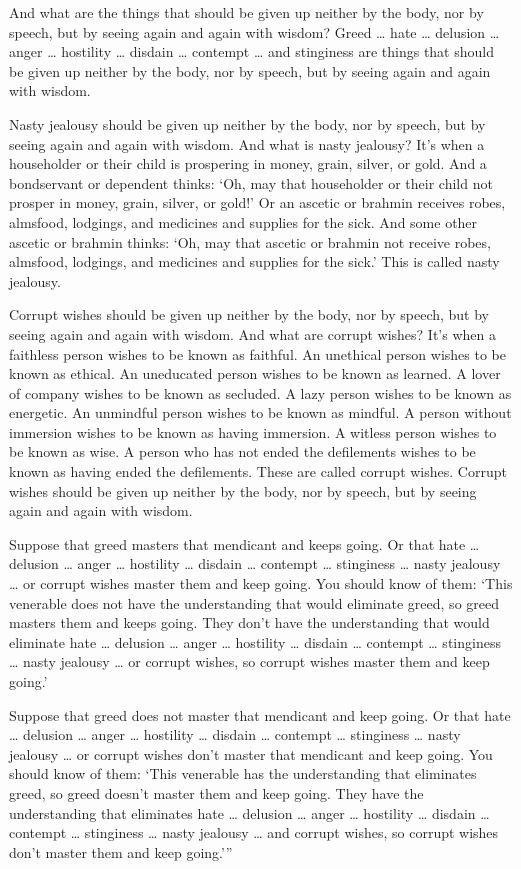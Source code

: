 \documentclass[12pt,openany]{book}%
\begin{document}
And what are the things that should be given up neither by the body, nor by speech, but by seeing again and again with wisdom? Greed … hate … delusion … anger … hostility … disdain … contempt … and stinginess are things that should be given up neither by the body, nor by speech, but by seeing again and again with wisdom. 

Nasty jealousy should be given up neither by the body, nor by speech, but by seeing again and again with wisdom. And what is nasty jealousy? It’s when a householder or their child is prospering in money, grain, silver, or gold. And a bondservant or dependent thinks: ‘Oh, may that householder or their child not prosper in money, grain, silver, or gold!’ Or an ascetic or brahmin receives robes, almsfood, lodgings, and medicines and supplies for the sick. And some other ascetic or brahmin thinks: ‘Oh, may that ascetic or brahmin not receive robes, almsfood, lodgings, and medicines and supplies for the sick.’ This is called nasty jealousy. 

Corrupt wishes should be given up neither by the body, nor by speech, but by seeing again and again with wisdom. And what are corrupt wishes? It’s when a faithless person wishes to be known as faithful. An unethical person wishes to be known as ethical. An uneducated person wishes to be known as learned. A lover of company wishes to be known as secluded. A lazy person wishes to be known as energetic. An unmindful person wishes to be known as mindful. A person without immersion wishes to be known as having immersion. A witless person wishes to be known as wise. A person who has not ended the defilements wishes to be known as having ended the defilements. These are called corrupt wishes. Corrupt wishes should be given up neither by the body, nor by speech, but by seeing again and again with wisdom. 

Suppose that greed masters that mendicant and keeps going. Or that hate … delusion … anger … hostility … disdain … contempt … stinginess … nasty jealousy … or corrupt wishes master them and keep going. You should know of them: ‘This venerable does not have the understanding that would eliminate greed, so greed masters them and keeps going. They don’t have the understanding that would eliminate hate … delusion … anger … hostility … disdain … contempt … stinginess … nasty jealousy … or corrupt wishes, so corrupt wishes master them and keep going.’ 

Suppose that greed does not master that mendicant and keep going. Or that hate … delusion … anger … hostility … disdain … contempt … stinginess … nasty jealousy … or corrupt wishes don’t master that mendicant and keep going. You should know of them: ‘This venerable has the understanding that eliminates greed, so greed doesn’t master them and keep going. They have the understanding that eliminates hate … delusion … anger … hostility … disdain … contempt … stinginess … nasty jealousy … and corrupt wishes, so corrupt wishes don’t master them and keep going.’” 
\end{document}
